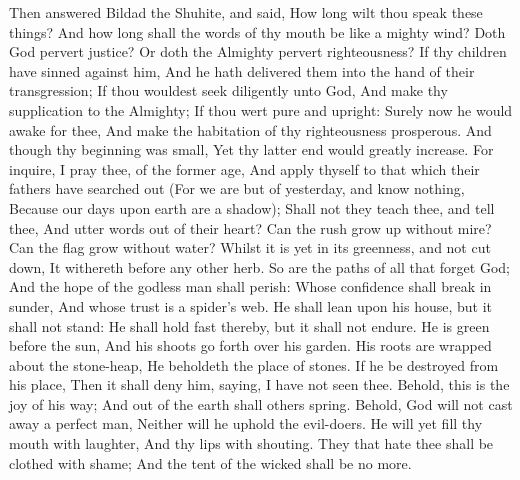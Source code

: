 Then answered Bildad the Shuhite, and said,  How long wilt thou speak these things? And how long shall the words of thy mouth be like a mighty wind?  Doth God pervert justice? Or doth the Almighty pervert righteousness?  If thy children have sinned against him, And he hath delivered them into the hand of their transgression;  If thou wouldest seek diligently unto God, And make thy supplication to the Almighty;  If thou wert pure and upright: Surely now he would awake for thee, And make the habitation of thy righteousness prosperous.  And though thy beginning was small, Yet thy latter end would greatly increase.  For inquire, I pray thee, of the former age, And apply thyself to that which their fathers have searched out  (For we are but of yesterday, and know nothing, Because our days upon earth are a shadow);  Shall not they teach thee, and tell thee, And utter words out of their heart?  Can the rush grow up without mire? Can the flag grow without water?  Whilst it is yet in its greenness, and not cut down, It withereth before any other herb.  So are the paths of all that forget God; And the hope of the godless man shall perish:  Whose confidence shall break in sunder, And whose trust is a spider’s web.  He shall lean upon his house, but it shall not stand: He shall hold fast thereby, but it shall not endure.  He is green before the sun, And his shoots go forth over his garden.  His roots are wrapped about the stone-heap, He beholdeth the place of stones.  If he be destroyed from his place, Then it shall deny him, saying, I have not seen thee.  Behold, this is the joy of his way; And out of the earth shall others spring.  Behold, God will not cast away a perfect man, Neither will he uphold the evil-doers.  He will yet fill thy mouth with laughter, And thy lips with shouting.  They that hate thee shall be clothed with shame; And the tent of the wicked shall be no more. 

